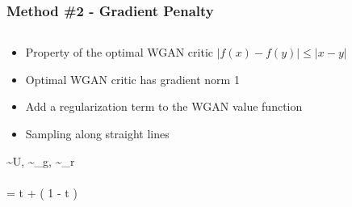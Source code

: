 \documentclass{Bredelebeamer}
\begin{document}
\begin{frame}
	\frametitle{Method \#2 - Gradient Penalty}
	\begin{columns}
	\begin{column}{0.5\textwidth}
		\begin{itemize}[<+->]
			\item Property of the optimal WGAN critic $ \vert f(x) - f(y) \vert \leq \vert x - y \vert $
			\item Optimal WGAN critic has gradient norm 1
			\item Add a regularization term to the WGAN value function
			\item Sampling along straight lines
		\end{itemize}
		\pause[4]
		\begin{gathered}
			\quad \quad \epsilon \sim U\big[0, 1 \big],  \sim {}_g,  \sim {}_r \\
			\\

		\quad {} = t  + \left( 1 - t \right) 


\end{gathered}
\end{column}
\end{columns}
\end{frame}
\end{document}

